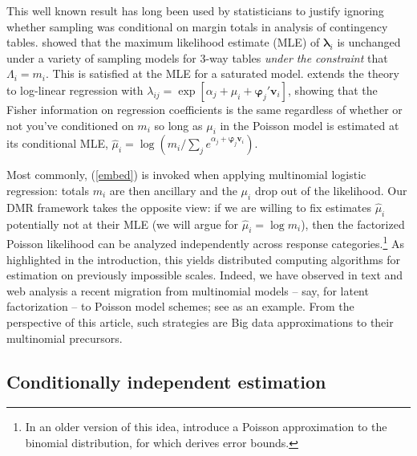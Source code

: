 \documentclass[12pt]{article}
\newcommand{\bs}[1]{\boldsymbol{#1}}
\newcommand{\bm}[1]{\mathbf{#1}}
\begin{document}
This well known result has long been used by statisticians to justify ignoring
whether sampling was conditional on margin totals in analysis of contingency
tables. \cite{birch_maximum_1963} showed that the maximum likelihood estimate
(MLE) of $\bs{\lambda}_i$ is unchanged under a variety of sampling models for
3-way tables {\it under the constraint} that $\Lambda_{i} = m_i$. This is
satisfied at the MLE for a saturated model. \cite{palmgren_fisher_1981}
extends the theory to log-linear regression with $\lambda_{ij} = \exp[\alpha_j
+ \mu_i + \bs{\varphi}_j'\bm{v}_i]$, showing that the Fisher information on
  regression coefficients is the same regardless of whether or not you've
  conditioned on $m_i$  so long as $\mu_i$ in the Poisson model is estimated
  at its conditional MLE, $\hat \mu_i =
\log\left(m_i/\sum_j e^{\alpha_j + \bs{\varphi}_j\bm{v}_i}\right)$.  

Most commonly, (\ref{embed}) is invoked when applying multinomial logistic
regression: totals $m_i$ are then ancillary and the $\mu_i$ drop out of the
likelihood.  Our DMR framework takes the opposite view: if we are willing to
fix estimates $\hat\mu_i$ potentially not at their MLE (we will argue for
$\hat\mu_i = \log m_i$), then the factorized Poisson likelihood can be
analyzed independently across response categories.\footnote{In an older version
of this idea, \cite{hodges_poisson_1960} introduce a Poisson approximation
to the binomial distribution, for which
\cite{mcdonald_poisson_1980} derives error bounds.} As
highlighted in the introduction, this yields distributed computing algorithms
for estimation on previously impossible scales.  Indeed, we have observed in
text and web analysis a recent migration from multinomial models -- say, for
latent factorization -- to Poisson model schemes; see
\citet{gopalan_scalable_2013} as an example.  From the perspective of this
article, such strategies are Big data approximations to their
multinomial precursors.

\subsection{Conditionally independent estimation}
\end{document}
